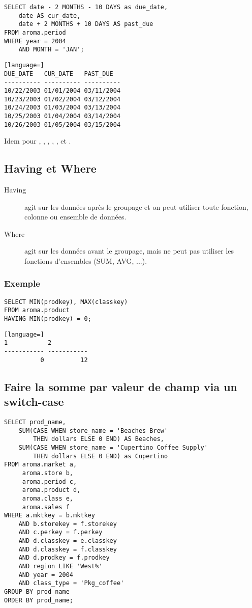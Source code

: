 \begin{lstlisting}
SELECT date - 2 MONTHS - 10 DAYS as due_date,
    date AS cur_date,
    date + 2 MONTHS + 10 DAYS AS past_due
FROM aroma.period
WHERE year = 2004
    AND MONTH = 'JAN';
\end{lstlisting}

\begin{lstlisting}[language=]
DUE_DATE   CUR_DATE   PAST_DUE  
---------- ---------- ----------
10/22/2003 01/01/2004 03/11/2004
10/23/2003 01/02/2004 03/12/2004
10/24/2003 01/03/2004 03/13/2004
10/25/2003 01/04/2004 03/14/2004
10/26/2003 01/05/2004 03/15/2004
\end{lstlisting}

Idem pour , , , , , et .

\subsection{Having et Where}
\begin{description}
    \item[Having] agit sur les données après le groupage et on peut utiliser toute fonction, colonne ou ensemble de données.
    
    \item[Where] agit sur les données avant le groupage, mais ne peut pas utiliser les fonctions d'ensembles (SUM, AVG, ...).
\end{description}

\subsubsection{Exemple}
\begin{lstlisting}
SELECT MIN(prodkey), MAX(classkey)
FROM aroma.product
HAVING MIN(prodkey) = 0;
\end{lstlisting}

\begin{lstlisting}[language=]
1           2          
----------- -----------
          0          12
\end{lstlisting}

\subsection{Faire la somme par valeur de champ via un switch-case}
\begin{lstlisting}
SELECT prod_name,
    SUM(CASE WHEN store_name = 'Beaches Brew'
        THEN dollars ELSE 0 END) AS Beaches,
    SUM(CASE WHEN store_name = 'Cupertino Coffee Supply'
        THEN dollars ELSE 0 END) as Cupertino
FROM aroma.market a,
     aroma.store b,
     aroma.period c,
     aroma.product d,
     aroma.class e,
     aroma.sales f
WHERE a.mktkey = b.mktkey
    AND b.storekey = f.storekey
    AND c.perkey = f.perkey
    AND d.classkey = e.classkey
    AND d.classkey = f.classkey
    AND d.prodkey = f.prodkey
    AND region LIKE 'West%'
    AND year = 2004
    AND class_type = 'Pkg_coffee'
GROUP BY prod_name
ORDER BY prod_name;
\end{lstlisting}


